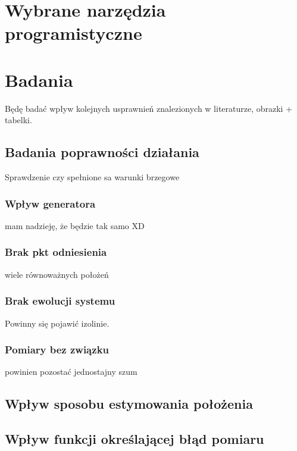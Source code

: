 \documentclass[10pt,a4paper]{article}
\begin{document}
\section{Wybrane narzędzia programistyczne}
\section{Badania} \label{przeg}
Będę badać wpływ kolejnych usprawnień znalezionych w literaturze, obrazki + tabelki.
\subsection{Badania poprawności działania}
Sprawdzenie czy spełnione sa warunki brzegowe
\subsubsection{Wpływ generatora}
mam nadzieję, że będzie tak samo XD
\subsubsection{Brak pkt odniesienia}
wiele równoważnych położeń
\subsubsection{Brak ewolucji systemu}
Powinny się pojawić izolinie.
\subsubsection{Pomiary bez związku}
powinien pozostać jednostajny szum

\subsection{Wpływ sposobu estymowania położenia}
\subsection{Wpływ funkcji określającej błąd pomiaru}
\end{document}

